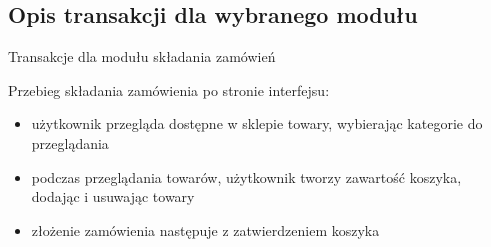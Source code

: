 \documentclass[10pt,a4paper]{article}
\begin{document}
   		\newpage
   		\subsection{Opis transakcji dla wybranego modułu}
		Transakcje dla modułu składania zamówień

		Przebieg składania zamówienia po stronie interfejsu:
		\begin{itemize}
			\item użytkownik przegląda dostępne w sklepie towary, wybierając kategorie do przeglądania
			\item podczas przeglądania towarów, użytkownik tworzy zawartość koszyka, dodając i usuwając towary
			\item złożenie zamówienia następuje z zatwierdzeniem koszyka
		\end{itemize}
		
\end{document}

